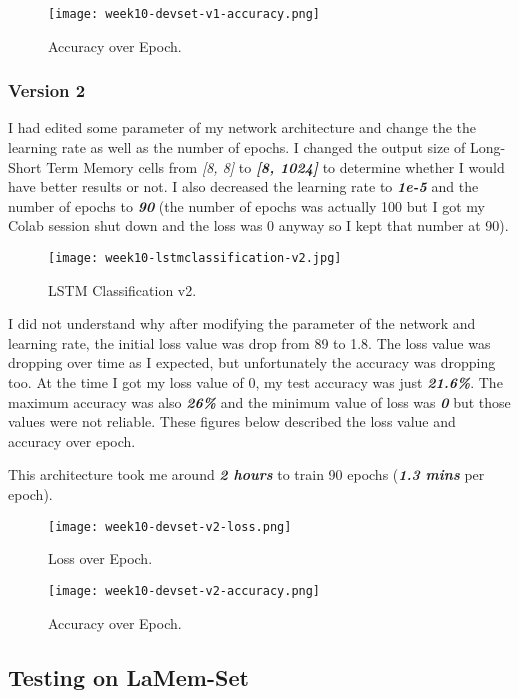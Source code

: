 \newpage
\begin{figure}[!ht]
\centering
\texttt{[image: week10-devset-v1-accuracy.png]}
\caption{Accuracy over Epoch.}
\end{figure}

\subsubsection{Version 2}
I had edited some parameter of my network architecture and change the the learning rate as well as the number of epochs. I changed the output size of Long-Short Term Memory cells from \emph{[8, 8]} to \textbf{\emph{[8, 1024]}} to determine whether I would have better results or not. I also decreased the learning rate to \textbf{\emph{1e-5}} and the number of epochs to \textbf{\emph{90}} (the number of epochs was actually 100 but I got my Colab session shut down and the loss was 0 anyway so I kept that number at 90).

\begin{figure}[!ht]
\centering
\texttt{[image: week10-lstmclassification-v2.jpg]}
\caption{LSTM Classification v2.}
\end{figure}

\newpage
I did not understand why after modifying the parameter of the network and learning rate, the initial loss value was drop from 89 to 1.8. The loss value was dropping over time as I expected, but unfortunately the accuracy was dropping too. At the time I got my loss value of 0, my test accuracy was just \textbf{\emph{21.6\%}}. The maximum accuracy was also \textbf{\emph{26\%}} and the minimum value of loss was \textbf{\emph{0}} but those values were not reliable. These figures below described the loss value and accuracy over epoch.

This architecture took me around \textbf{\emph{2 hours}} to train 90 epochs (\textbf{\emph{1.3 mins}} per epoch).

\begin{figure}[!ht]
\centering
\texttt{[image: week10-devset-v2-loss.png]}
\caption{Loss over Epoch.}
\end{figure}

\begin{figure}[!ht]
\centering
\texttt{[image: week10-devset-v2-accuracy.png]}
\caption{Accuracy over Epoch.}
\end{figure}

\subsection{Testing on LaMem-Set}
